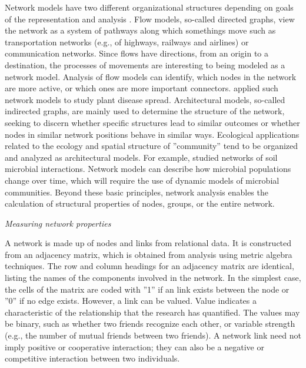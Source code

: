 Network models have two different organizational structures depending on goals of the representation and analysis . Flow models, so-called directed graphs, view the network as a system of pathways along which somethings move such as transportation networks (e.g., of highways, railways and airlines) or communication networks. Since flows have directions, from an origin to a destination, the processes of movements are interesting to being modeled as a network model. Analysis of flow models can identify, which nodes in the network are more active, or which ones are more important connectors.  applied such network models to study plant disease spread. Architectural models, so-called indirected graphs, are mainly used to determine the structure of the network, seeking to discern whether specific structures lead to similar outcomes or whether nodes in similar network positions behave in similar ways. Ecological applications related to the ecology and spatial structure of ''community'' tend to be organized and analyzed as architectural models. For example,  studied networks of soil microbial interactions. Network models can describe how microbial populations change over time, which will require the use of dynamic models of microbial communities. Beyond these basic principles, network analysis enables the calculation of structural properties of nodes, groups, or the entire network.

\textit{Measuring network properties}

A network is made up of nodes and links from relational data. It is constructed from an adjacency matrix, which is obtained from analysis using metric algebra techniques. The row and column headings for an adjacency matrix are identical, listing the names of the components involved in the network. In the simplest case, the cells of the matrix are coded with ''1'' if an link exists between the node or ''0'' if no edge exists. However, a link can be valued. Value indicates a characteristic of the relationship that the research has quantified. The values may be binary, such as whether two friends recognize each other, or variable strength (e.g., the number of mutual friends between two friends). A network link need not imply positive or cooperative interaction; they can also be a negative or competitive interaction between two individuals.    

